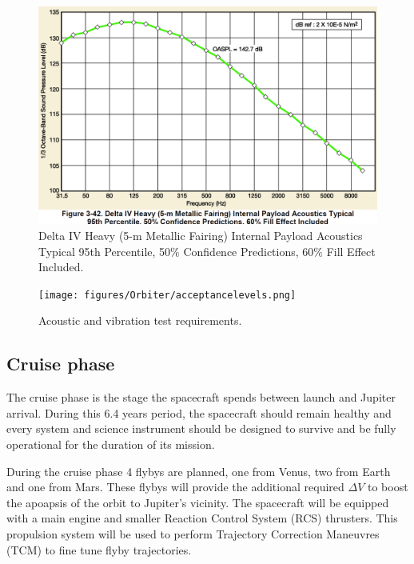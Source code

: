 \begin{figure}[htb]
\centering
\includegraphics[scale=0.3]{figures/Orbiter/acoustics.png}
\caption{Delta IV Heavy (5-m Metallic Fairing) Internal Payload Acoustics Typical 95th Percentile, 50\% Confidence Predictions, 60\% Fill Effect Included\cite{Atlasm}.}
\end{figure}

\begin{figure}[htb]
\centering
\texttt{[image: figures/Orbiter/acceptancelevels.png]}
\caption{Acoustic and vibration test requirements\cite{Atlasm}.}
\label{fig:testlevels}
\end{figure}

\subsection{Cruise phase}
The cruise phase is the stage the spacecraft spends between launch and Jupiter arrival. During this 6.4 years period, the spacecraft should remain healthy and every system and science instrument should be designed to survive and be fully operational for the duration of its mission. 

During the cruise phase 4 flybys are planned, one from Venus, two from Earth and one from Mars. These flybys will provide the additional required $\Delta V$ to boost the apoapsis of the orbit to Jupiter's vicinity. The spacecraft will be equipped with a main engine and smaller Reaction Control System (RCS) thrusters. This propulsion system will be used to perform Trajectory Correction Maneuvres (TCM) to fine tune flyby trajectories. 


